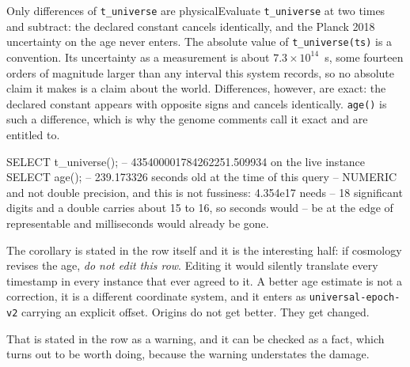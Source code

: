\begin{Correspondence}{Only differences of \texttt{t\_universe} are physical}{Evaluate \texttt{t\_universe} at two times and subtract: the declared constant cancels identically, and the Planck 2018 uncertainty on the age never enters.}
The absolute value of \texttt{t\_universe(ts)} is a convention. Its uncertainty as a measurement is about $7.3 \times 10^{14}$~s, some fourteen orders of magnitude larger than any interval this system records, so no absolute claim it makes is a claim about the world. Differences, however, are exact: the declared constant appears with opposite signs and cancels identically. \texttt{age()} is such a difference, which is why the genome comments call it exact and are entitled to.
\begin{Check}
SELECT t_universe();  -- 435400001784262251.509934 on the live instance
SELECT age();         -- 239.173326 seconds old at the time of this query
-- NUMERIC and not double precision, and this is not fussiness: 4.354e17 needs
-- 18 significant digits and a double carries about 15 to 16, so seconds would
-- be at the edge of representable and milliseconds would already be gone.
\end{Check}
\end{Correspondence}

The corollary is stated in the row itself and it is the interesting half: if cosmology revises the age, \emph{do not edit this row}. Editing it would silently translate every timestamp in every instance that ever agreed to it. A better age estimate is not a correction, it is a different coordinate system, and it enters as \texttt{universal-epoch-v2} carrying an explicit offset. Origins do not get better. They get changed.

That is stated in the row as a warning, and it can be checked as a fact, which turns out to be worth doing, because the warning understates the damage.

